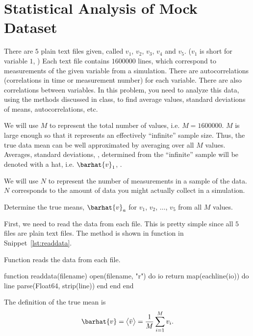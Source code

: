 \section{Statistical Analysis of Mock Dataset}

There are \(5\) plain text files given, called \(v_1\), \(v_2\), \(v_3\), \(v_4\) and \(v_5\).
(\(v_1\) is short for variable \(1\), \etc{}) Each text file contains \(1600000\) lines,
which correspond to
measurements of the given variable from a simulation. There are autocorrelations
(correlations in time or measurement number) for each variable. There are also correlations
between variables. In this problem, you need to analyze this data, using the methods
discussed in class, to find average values, standard deviations of means, autocorrelations,
etc.

We will use \(M\) to represent the total number of values, i.e. \(M = 1600000\). \(M\) is large
enough so that it represents an effectively ``infinite'' sample size. Thus, the true data
mean can be well approximated by averaging over all \(M\) values. Averages, standard
deviations, \etc, determined from the ``infinite'' sample will be denoted with a hat, i.e.
\(\barhat{v}_1\), \etc.

We will use \(N\) to represent the number of measurements in a sample of the data. \(N\)
corresponds to the amount of data you might actually collect in a simulation.

\Question{} Determine the true means, \(\barhat{v}_a\) for \(v_1\), \(v_2\), \(\ldots\),
\(v_5\) from all \(M\) values.

\Answer{}
First, we need to read the data from each file. This is pretty simple since all \(5\) files
are plain text files. The method is shown in function  in
Snippet~\ref{lst:readdata}.

\begin{algorithm}[H]
    \caption{Function  reads the data from each file.}
    \label{lst:readdata}
    \begin{juliacode}
        function readdata(filename)
            open(filename, "r") do io
                return map(eachline(io)) do line
                    parse(Float64, strip(line))
                end
            end
        end
    \end{juliacode}
\end{algorithm}

The definition of the true mean is
\begin{equation}
    \barhat{v} = \bigl \langle \bar{v} \bigr \rangle = \frac{ 1 }{ M } \sum_{i=1}^{M} v_i.
\end{equation}

